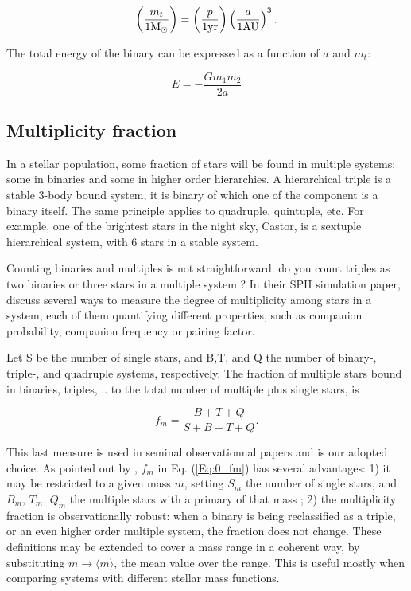 \begin{equation}
\left( \frac{m_t}{1 {\textrm{M}_\odot}} \right) = \left( \frac{p}{1 \textrm{yr}} \right) \left( \frac{a}{1 \textrm{AU}} \right)^3 .
\end{equation}


The total energy of the binary can be expressed as a function of $a$ and $m_t$:

\begin{equation}
E = - \frac{G m_1 m_2}{2a} 
\end{equation}



\subsection{Multiplicity fraction}

In a stellar population, some fraction of stars will be found in multiple systems: some  in binaries and some in higher order hierarchies. A hierarchical triple is a stable 3-body bound system, it is binary of which one of the component is a binary itself. The same principle applies to quadruple, quintuple, etc. For example, one of the brightest stars in the night sky, Castor, is a sextuple hierarchical system, with 6 stars in a stable system.

Counting binaries and multiples is not straightforward: do you count triples as two binaries or three stars in a multiple system ? In their SPH simulation paper, \cite{Goodwin2004a} discuss several ways to measure the degree of multiplicity among stars in a system, each of them quantifying different properties, such as companion probability, companion frequency or pairing factor. 
 
 Let  S be the number of single stars, and B,T, and Q the number of binary-, triple-, and quadruple systems, respectively. The fraction of multiple stars bound in binaries, triples, .. to the total number of multiple plus single stars, is

\begin{equation}
\label{Eq:0_fm} 
f_m = \frac{B + T + Q}{S + B + T + Q}. 
\end{equation}

This last  measure is used in seminal observationnal papers \citep{DM91,Raghavan2010} and is our adopted choice. As pointed out by \cite{Hubber2005}, $f_m$ in Eq. (\ref{Eq:0_fm}) has several advantages: 1) it  may be  restricted to a given mass $m$, setting  $S_m$ the number of single stars, and $B_m,\, T_m,\, Q_m$  the multiple stars with a primary of that mass ;  2)  the multiplicity fraction is observationally robust: when a binary is being reclassified as a triple, or an even higher order multiple system, the fraction does not change. 
 These definitions may be extended to cover a mass range  in a coherent way, by substituting $m \rightarrow \langle m\rangle$, the mean value over the range. This is useful mostly when comparing  systems with different stellar mass functions. 


